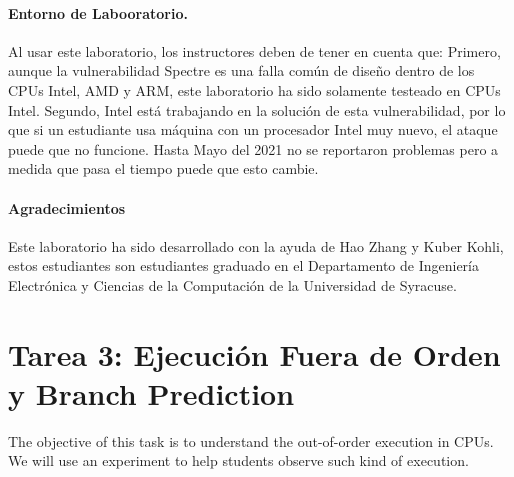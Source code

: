 \paragraph{Entorno de Labooratorio.} \seedenvironmentAB

Al usar este laboratorio, los instructores deben de tener en cuenta que:
Primero, aunque la vulnerabilidad Spectre es una falla común de diseño dentro de los CPUs Intel, AMD y ARM, este laboratorio ha sido solamente testeado en CPUs Intel.
Segundo, Intel está trabajando en la solución de esta vulnerabilidad, por lo que si un estudiante usa máquina con un procesador Intel muy nuevo, el ataque puede que no funcione. Hasta Mayo del 2021 no se reportaron problemas pero a medida que pasa el tiempo puede que esto cambie.

\paragraph{Agradecimientos} Este laboratorio ha sido desarrollado con la ayuda de 
Hao Zhang y Kuber Kohli, estos estudiantes son estudiantes graduado en el Departamento de Ingeniería Electrónica y Ciencias de la Computación de la Universidad de Syracuse.




\newcommand{\sideChannelFigs}{../Meltdown_Attack/Figs}





\section{Tarea 3: Ejecución Fuera de Orden y Branch Prediction}

The objective of this task is to understand the out-of-order execution
in CPUs. We will use an experiment to help students observe
such kind of execution. 



